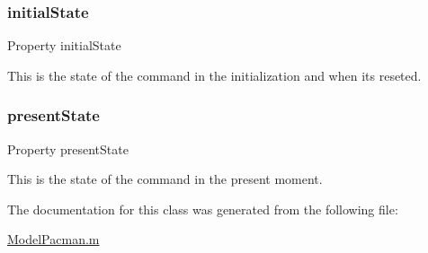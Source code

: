 \subsubsection{\texorpdfstring{initial\+State}{initialState}}
{\footnotesize\ttfamily Property initial\+State}



This is the state of the command in the initialization and when it\textquotesingle{}s reseted. 

\mbox{\label{class_model_pacman_a9624cc7c421a50fa5086b0ebd0cd5fe3}} 
\subsubsection{\texorpdfstring{present\+State}{presentState}}
{\footnotesize\ttfamily Property present\+State}



This is the state of the command in the present moment. 



The documentation for this class was generated from the following file\+:\begin{DoxyCompactItemize}
\item 
\hyperlink{_model_pacman_8m}{Model\+Pacman.\+m}\end{DoxyCompactItemize}
